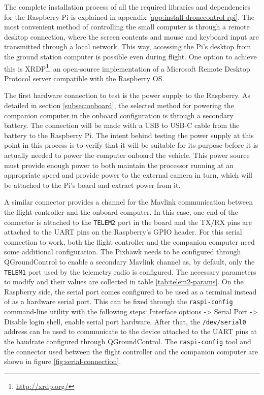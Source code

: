 
The complete installation process of all the required libraries and dependencies for the Raspberry Pi is explained in appendix \ref{app:install-dronecontrol-rpi}.
The most convenient method of controlling the small computer is through a remote desktop connection, where the screen contents and mouse and keyboard input are transmitted through a local network.
This way, accessing the Pi's desktop from the ground station computer is possible even during flight.
One option to achieve this is XRDP\footnote{\url{http://xrdp.org/}}, an open-source implementation of a Microsoft Remote Desktop Protocol server compatible with the Raspberry OS.

The first hardware connection to test is the power supply to the Raspberry.
As detailed in section \ref{subsec:onboard}, the selected method for powering the companion computer in the onboard configuration is through a secondary battery.
The connection will be made with a USB to USB-C cable from the battery to the Raspberry Pi.
The intent behind testing the power supply at this point in this process is to verify that it will be suitable for its purpose before it is actually needed to power the computer onboard the vehicle.
This power source must provide enough power to both maintain the processor running at an appropriate speed and provide power to the external camera in turn, which will be attached to the Pi's board and extract power from it.

A similar connector provides a channel for the Mavlink communication between the flight controller and the onboard computer.
In this case, one end of the connector is attached to the \texttt{TELEM2} port in the board and the TX/RX pins are attached to the UART pins on the Raspberry's GPIO header.
For this serial connection to work, both the flight controller and the companion computer need some additional configuration.
The Pixhawk needs to be configured through QGroundControl to enable a secondary Mavlink channel as, by default, only the \texttt{TELEM1} port used by the telemetry radio is configured.
The necessary parameters to modify and their values are collected in table \ref{tab:telem2-params}.
On the Raspberry side, the serial port comes configured to be used as a terminal instead of as a hardware serial port.
This can be fixed through the \texttt{raspi-config} command-line utility with the following steps: Interface options -> Serial Port -> Disable login shell, enable serial port hardware.
After that, the \texttt{/dev/serial0} address can be used to communicate to the device attached to the UART pins at the baudrate configured through QGroundControl.
The \texttt{raspi-config} tool and the connector used between the flight controller and the companion computer are shown in figure \ref{fig:serial-connection}.

